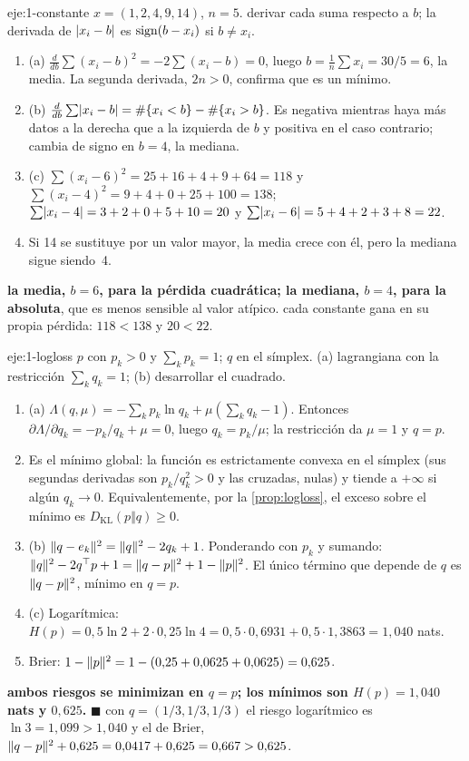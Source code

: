 \begin{solucion}{eje:1-constante}
\datos $x=(1,2,4,9,14)$, $n=5$.
\planteamiento derivar cada suma respecto a $b$; la derivada de $\lvert x_i-b\rvert$ es $\operatorname{sign}(b-x_i)$ si $b\ne x_i$.
\pasos
\begin{enumerate}[label=\arabic*.]
  \item (a) $\frac{d}{db}\sum(x_i-b)^{2}=-2\sum(x_i-b)=0$, luego $b=\frac1n\sum x_i=30/5=6$, la media. La segunda derivada, $2n>0$, confirma que es un mínimo.
  \item (b) $\frac{d}{db}\sum\lvert x_i-b\rvert=\#\{x_i<b\}-\#\{x_i>b\}$. Es negativa mientras haya más datos a la derecha que a la izquierda de $b$ y positiva en el caso contrario; cambia de signo en $b=4$, la mediana.
  \item (c) $\sum(x_i-6)^{2}=25+16+4+9+64=118$ y $\sum(x_i-4)^{2}=9+4+0+25+100=138$; $\sum\lvert x_i-4\rvert=3+2+0+5+10=20$ y $\sum\lvert x_i-6\rvert=5+4+2+3+8=22$.
  \item Si 14 se sustituye por un valor mayor, la media crece con él, pero la mediana sigue siendo~4.
\end{enumerate}
\resultado \textbf{la media, $b=6$, para la pérdida cuadrática; la mediana, $b=4$, para la absoluta}, que es menos sensible al valor atípico.
\comprobacion cada constante gana en su propia pérdida: $118<138$ y $20<22$.
\end{solucion}

\begin{solucion}{eje:1-logloss}
\datos $p$ con $p_k>0$ y $\sum_kp_k=1$; $q$ en el símplex.
\planteamiento (a) lagrangiana con la restricción $\sum_kq_k=1$; (b) desarrollar el cuadrado.
\pasos
\begin{enumerate}[label=\arabic*.]
  \item (a) $\Lambda(q,\mu)=-\sum_kp_k\ln q_k+\mu(\sum_kq_k-1)$. Entonces $\partial\Lambda/\partial q_k=-p_k/q_k+\mu=0$, luego $q_k=p_k/\mu$; la restricción da $\mu=1$ y $q=p$.
  \item Es el mínimo global: la función es estrictamente convexa en el símplex (sus segundas derivadas son $p_k/q_k^{2}>0$ y las cruzadas, nulas) y tiende a $+\infty$ si algún $q_k\to 0$. Equivalentemente, por la \cref{prop:logloss}, el exceso sobre el mínimo es $D_{\mathrm{KL}}(p\Vert q)\ge 0$.
  \item (b) $\lVert q-e_k\rVert^{2}=\lVert q\rVert^{2}-2q_k+1$. Ponderando con $p_k$ y sumando: $\lVert q\rVert^{2}-2q^{\top}p+1=\lVert q-p\rVert^{2}+1-\lVert p\rVert^{2}$. El único término que depende de $q$ es $\lVert q-p\rVert^{2}$, mínimo en $q=p$.
  \item (c) Logarítmica: $H(p)=0{,}5\ln 2+2\cdot 0{,}25\ln 4=0{,}5\cdot 0{,}6931+0{,}5\cdot 1{,}3863=1{,}040$ nats.
  \item Brier: $1-\lVert p\rVert^{2}=1-(0{,}25+0{,}0625+0{,}0625)=0{,}625$.
\end{enumerate}
\resultado \textbf{ambos riesgos se minimizan en $q=p$; los mínimos son $H(p)=1{,}040$ nats y $0{,}625$.} $\blacksquare$
\comprobacion con $q=(1/3,1/3,1/3)$ el riesgo logarítmico es $\ln 3=1{,}099>1{,}040$ y el de Brier, $\lVert q-p\rVert^{2}+0{,}625=0{,}0417+0{,}625=0{,}667>0{,}625$.
\end{solucion}

